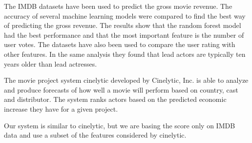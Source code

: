 The IMDB datasets have been used to predict the gross movie revenue\cite{JaeHuang}. The accuracy of several machine learning models
were compared to find the best way of predicting the gross revenue. The results show that the random forest model had the best performance
and that the most important feature is the number of user votes. The datasets have also been used to compare the user rating with other
features\cite{MaxWoolf}. In the same analysis they found that lead actors are typically ten years older than lead actresses.

The movie project system cinelytic developed by Cinelytic, Inc.\cite{Cinelytic} is able to analyze and produce forecasts of how well a movie
will perform based on country, cast and distributor. The system ranks actors based on the predicted economic increase they have for
a given project. 

Our system is similar to cinelytic, but we are basing the score only on IMDB data and use a subset of the features considered by cinelytic.